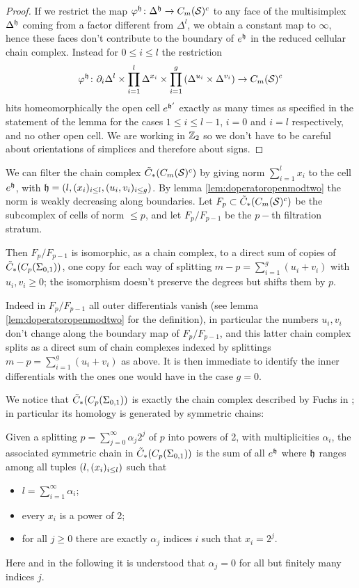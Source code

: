 \begin{proof}
 If we restrict the map $\varphi^{\mathfrak{h}}\colon\Delta^{\mathfrak{h}}\to C_m(\mathcal{S})^c$ to any face of the multisimplex
 $\Delta^{\mathfrak{h}}$ coming from a factor different from $\Delta^l$,
 we obtain a constant map to $\infty$, hence these faces don't contribute
 to the boundary of $e^{\mathfrak{h}}$ in the reduced cellular chain complex. Instead for $0\leq i\leq l$ the restriction
 \[
  \varphi^{\mathfrak{h}}\colon\partial_i\Delta^l\times\prod_{i=1}^l\Delta^{x_i}\times\prod_{i=1}^g\left(\Delta^{u_i}\times\Delta^{v_i}\right)\to C_m(\mathcal{S})^c
 \]
 hits homeomorphically the open cell $e^{\mathfrak{h}'}$
 exactly as many times as specified in the statement
 of the lemma for the cases $1\leq i\leq l-1$,
 $i=0$ and $i=l$ respectively, and no other open cell.
 We are working in $\mathbb{Z}_2$ so we don't have to be careful about orientations of simplices
 and therefore about signs.
\end{proof}

We can filter the chain complex $\tilde{C}_*(C_m(\mathcal{S})^c)$ by giving norm $\sum_{i=1}^lx_i$ to
the cell $e^{\mathfrak{h}}$, with $\mathfrak{h}=(l,(x_i)_{i\leq l},(u_i,v_i)_{i\leq g})$. By lemma \ref{lem:doperatoropenmodtwo}
the norm is weakly decreasing along boundaries. Let $F_p\subset\tilde{C}_*(C_m(\mathcal{S})^c)$ be the subcomplex of cells
of norm $\leq p$, and let $F_p/F_{p-1}$ be the $p-$th filtration stratum.

Then $F_p/F_{p-1}$ is isomorphic, as a chain complex, to a direct sum of copies of $\tilde{C}_*(C_p(\Sigma_{0,1}))$,
one copy for each way of splitting $m-p=\sum_{i=1}^g (u_i+v_i)$ with $u_i,v_i\geq 0$; the isomorphism
doesn't preserve the degrees but shifts them by $p$.

Indeed in $F_p/F_{p-1}$ all outer
differentials vanish (see lemma \ref{lem:doperatoropenmodtwo}
for the definition), in particular the numbers $u_i,v_i$
don't change along the boundary map of $F_p/F_{p-1}$, and this latter chain complex splits as a direct sum
of chain complexes indexed by splittings $m-p=\sum_{i=1}^g (u_i+v_i)$ as above.
It is then immediate to identify the inner differentials
with the ones one would have in the case $g=0$.

We notice that $\tilde{C}_*(C_p(\Sigma_{0,1}))$ is exactly the chain complex described by Fuchs in
\cite{Fuchs:CohomBraidModtwo}; in particular its homology is generated by symmetric chains:
\begin{defn}
\label{defn:symchain}
Given a splitting $p=\sum_{j=0}^{\infty}\alpha_j2^j$ of $p$ into powers of 2, with multiplicities $\alpha_i$,
the associated symmetric chain in $\tilde{C}_*(C_p(\Sigma_{0,1}))$
is the sum of all $e^{\mathfrak{h}}$ where $\mathfrak{h}$ ranges among all tuples
$\left(l,(x_i)_{i\leq l}\right)$ such that
\begin{itemize}
 \item $l=\sum_{i=1}^{\infty}\alpha_i$;
 \item every $x_i$ is a power of 2;
 \item for all $j\geq 0$ there are exactly $\alpha_j$ indices $i$ such that $x_i=2^j$.
\end{itemize}
Here and in the following it is understood that $\alpha_j=0$ for all but finitely many indices $j$.
\end{defn}

